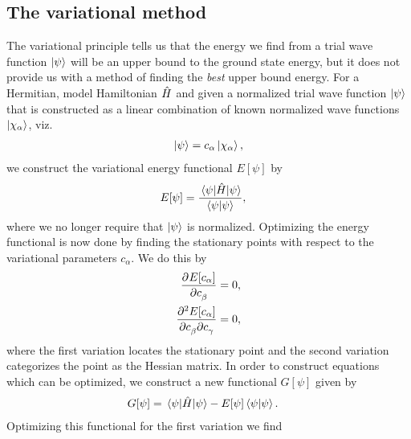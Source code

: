         \subsection{The variational method}
            The variational principle tells us that the energy we find from a
            trial wave function $\ket{\psi}$ will be an upper bound to the
            ground state energy, but it does not provide us with a method of
            finding the \emph{best} upper bound energy.
            For a Hermitian, model Hamiltonian $\hat{H}$ and given a normalized
            trial wave function $\ket{\psi}$ that is constructed as a linear
            combination of known normalized wave functions
            $\ket{\chi_{\alpha}}$, viz.
            \begin{align}
                \ket{\psi} = c_{\alpha}\ket{\chi_{\alpha}},
            \end{align}
            we construct the variational energy functional $E[\psi]$ by
            \begin{align}
                E[\psi]
                &= \frac{\mel{\psi}{\hat{H}}{\psi}}
                {\braket{\psi}{\psi}},
            \end{align}
            where we no longer require that $\ket{\psi}$ is normalized.
            Optimizing the energy functional is now done by finding the
            stationary points with respect to the variational parameters
            $c_{\alpha}$.
            We do this by
            \begin{align}
                \dpd[]{E[c_{\alpha}]}{c_{\beta}} &= 0,
                \\
                \dmd{E[c_{\alpha}]}{2}{c_{\beta}}{}{c_{\gamma}}{} &= 0,
            \end{align}
            where the first variation locates the stationary point and the
            second variation categorizes the point as the Hessian matrix.
            In order to construct equations which can be optimized, we
            construct a new functional $G[\psi]$ given by
            \cite{helgaker-molecular}
            \begin{align}
                G[\psi]
                &=
                \mel{\psi}{\hat{H}}{\psi}
                - E[\psi] \braket{\psi}{\psi}.
            \end{align}
            Optimizing this functional for the first variation we find
